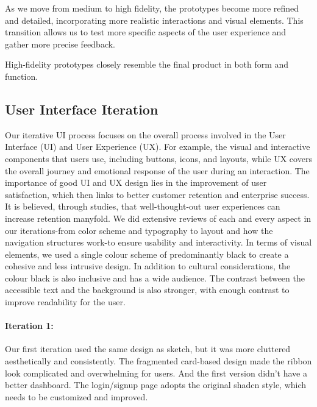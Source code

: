 As we move from medium to high fidelity, the prototypes become more refined and detailed, incorporating more realistic interactions and visual elements. This transition allows us to test more specific aspects of the user experience and gather more precise feedback.

High-fidelity prototypes closely resemble the final product in both form and function.


\subsection{User Interface Iteration}
Our iterative UI process focuses on the overall process involved in the User Interface (UI) and User Experience (UX). For example, the visual and interactive components that users use, including buttons, icons, and layouts, while UX covers the overall journey and emotional response of the user during an interaction. The importance of good UI and UX design lies in the improvement of user satisfaction, which then links to better customer retention and enterprise success. It is believed, through studies, that well-thought-out user experiences can increase retention manyfold.\cite{psycray2023} We did extensive reviews of each and every aspect in our iterations-from color scheme and typography to layout and how the navigation structures work-to ensure usability and interactivity. In terms of visual elements, we used a single colour scheme of predominantly black to create a cohesive and less intrusive design. In addition to cultural considerations, the colour black is also inclusive and has a wide audience. The contrast between the accessible text and the background is also stronger, with enough contrast to improve readability for the user.

\paragraph{Iteration 1:}

Our first iteration used the same design as sketch, but it was more cluttered aesthetically and consistently. The fragmented card-based design made the ribbon look complicated and overwhelming for users. And the first version didn't have a better dashboard. The login/signup page adopts the original shadcn style, which needs to be customized and improved.

